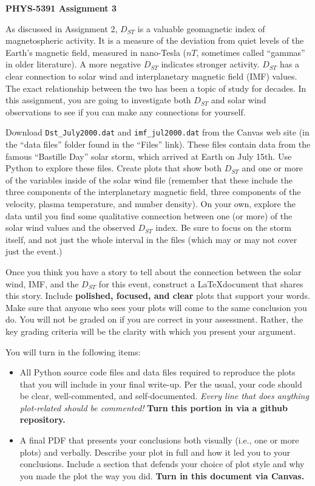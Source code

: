 \documentclass[12pt, letterpaper]{article}
\begin{document}
\begin{center}
  {\LARGE \textbf{PHYS-5391 Assignment 3}}\\
\end{center}

As discussed in Assignment 2, $D_{ST}$ is a valuable geomagnetic index of 
magnetospheric activity.  It is a measure of the deviation from quiet levels
of the Earth's magnetic field, measured in nano-Tesla ($nT$, sometimes called
``gammas'' in older literature).  A more negative $D_{ST}$ indicates stronger
activity.  $D_{ST}$ has a clear connection to solar wind
and interplanetary magnetic field (IMF) values.
The exact relationship between the two
has been a topic of study for decades.  In this assignment, you are going to
investigate both $D_{ST}$ and solar wind observations to see if you can make
any connections for yourself.

Download {\tt Dst\_July2000.dat} and {\tt imf\_jul2000.dat} from the Canvas
web site (in the ``data files'' folder found in the ``Files'' link).  These
files contain data from the famous ``Bastille Day'' solar storm, which arrived
at Earth on July 15th.  Use
Python to explore these files.  Create plots that show both $D_{ST}$ and one
or more of the variables inside of the solar wind file (remember that these
include the three components of the interplanetary magnetic field, three
components of the velocity, plasma temperature, and number density).
On your own,
explore the data until you find some qualitative connection between one (or
more) of the solar wind values and the observed $D_{ST}$ index.  Be sure to
focus on the storm itself, and not just the whole interval in the files (which
may or may not cover just the event.)

Once you think you have a story to tell about the connection between the
solar wind, IMF, and the $D_{ST}$ for this event, construct a \LaTeX document
that shares this story.  Include \textbf{polished, focused, and clear} plots
that support your words.  Make sure that anyone who sees your plots will
come to the same conclusion you do.  You will not be graded on if you are
correct in your assessment.  Rather, the key grading criteria will be the
clarity with which you present your argument.

You will turn in the following items:
\begin{itemize}
\item All Python source code files and data files required to reproduce
  the plots that you will include in your final write-up. Per the usual, your code
  should be clear, well-commented, and self-documented.  \emph{Every line that does
  anything plot-related should be commented!}  \textbf{Turn this portion in
    via a github repository.}
\item A final PDF that presents your conclusions both visually (i.e., one or
  more plots) and verbally.  Describe your plot in full and how it led you
  to your conclusions.  Include a section that defends your choice of plot
  style and why you made the plot the way you did.
  \textbf{Turn in this document via Canvas.}
\end{itemize}
\end{document}
